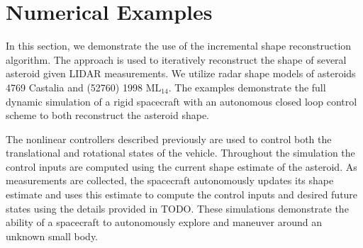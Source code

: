 \documentclass[letterpaper, paper,11pt]{AAS}		%
\begin{document}
\section{Numerical Examples}\label{sec:reconstruction_examples}

In this section, we demonstrate the use of the incremental shape reconstruction algorithm.
The approach is used to iteratively reconstruct the shape of several asteroid given LIDAR measurements.
We utilize radar shape models of asteroids \num{4769} Castalia and (\num{52760}) \num{1998} \(\text{ML}_{14}\).
The examples demonstrate the full dynamic simulation of a rigid spacecraft with an autonomous closed loop control scheme to both reconstruct the asteroid shape.

The nonlinear controllers described previously are used to control both the translational and rotational states of the vehicle.
Throughout the simulation the control inputs are computed using the current shape estimate of the asteroid. 
As measurements are collected, the spacecraft autonomously updates its shape estimate and uses this estimate to compute the control inputs and desired future states using the details provided in TODO.
These simulations demonstrate the ability of a spacecraft to autonomously explore and maneuver around an unknown small body.
\end{document}
